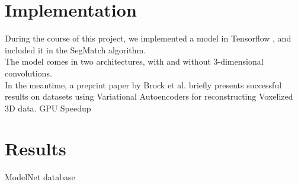\section{Implementation}
\label{sec:ae-implementation}

During the course of this project, we implemented a model in Tensorflow \cite{tensorflow}, and included it in the SegMatch algorithm.\\

The model comes in two architectures, with and without 3-dimensional convolutions.\\

In the meantime, a preprint paper by Brock et al.  \cite{voxel-autoencoder} briefly presents successful results on datasets using Variational Autoencoders for reconstructing Voxelized 3D data.
GPU Speedup

\section{Results}
\label{sec:ae-results}

ModelNet database \cite{modelnet}

